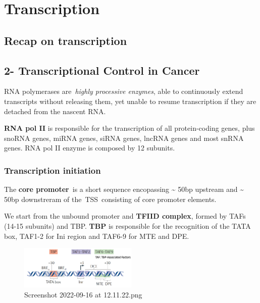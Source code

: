 \graphicspath{{chapters/_resources/}}

\chapter{Transcription}

\section{Recap on transcription}
\hypertarget{transcriptional-control-in-cancer}{%
\section{2- Transcriptional Control in Cancer}\label{transcriptional-control-in-cancer}}

RNA polymerases are~\emph{highly processive enzymes}, able to continuously extend transcripts without releasing them, yet unable to resume transcription if they are detached from the nascent RNA.

\textbf{RNA pol II} is responsible for the transcription of all protein-coding genes, plus snoRNA genes, miRNA genes, siRNA genes, lncRNA genes and most snRNA genes. RNA pol II enzyme is composed by 12 subunits.

\hypertarget{transcription-initiation}{%
\subsection{Transcription initiation}\label{transcription-initiation}}

The \textbf{core promoter}~is a short sequence encopassing \textasciitilde{} 50bp upstream and \textasciitilde{} 50bp downstreram of the~TSS~consisting of core promoter elements.

We start from the unbound promoter and \textbf{TFIID complex}, formed by TAFs (14-15 subunits) and TBP. \textbf{TBP} is responsible for the recognition of the TATA box, TAF1-2 for Ini region and TAF6-9 for MTE and DPE.

\begin{figure}
\centering
\includegraphics[width=0.5\textwidth]{../_resources/Screenshot_2022-09-16_at_12-11-22.png}
\caption{Screenshot 2022-09-16 at 12.11.22.png}
\end{figure}


